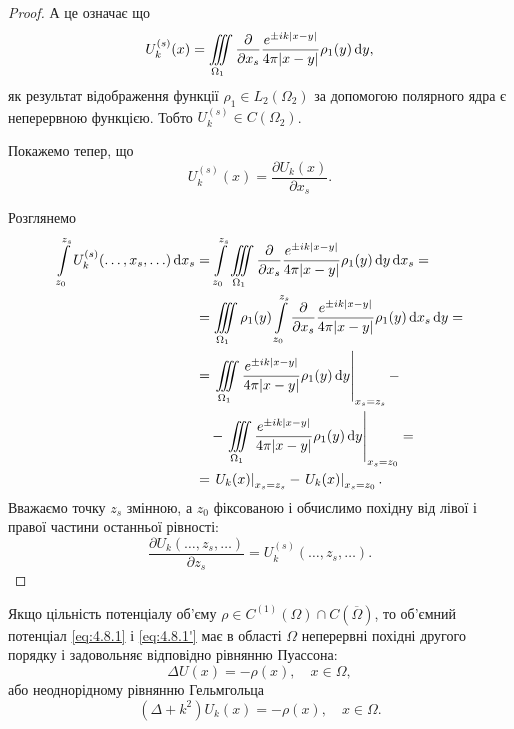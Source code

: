 \begin{proof}
	А це означає що
	\begin{equation}
		U_k^{(s)}(x) = \displaystyle\iiint\limits_{\Omega_1} \frac{\partial}{\partial x_s} \frac{e^{\pm i k |x - y|}}{4 \pi |x - y|} \rho_1(y) \mathop{}\!\mathrm{d} y,
	\end{equation}
	як результат відображення функції $\rho_1 \in L_2(\Omega_2)$ за допомогою полярного ядра є неперервною функцією. Тобто $U_k^{(s)} \in C(\Omega_2)$. \medskip

	Покажемо тепер, що
	\begin{equation}
		U_k^{(s)}(x) = \frac{\partial U_k(x)}{\partial x_s}.
	\end{equation}

	Розглянемо
	\begin{equation}
		\begin{aligned}
			\displaystyle\int\limits_{z_0}^{z_s} U_k^{(s)}(\ldots, x_s, \ldots) \mathop{}\!\mathrm{d} x_s &= \displaystyle\int\limits_{z_0}^{z_s} \displaystyle\iiint\limits_{\Omega_1} \frac{\partial}{\partial x_s} \frac{e^{\pm i k |x - y|}}{4 \pi |x - y|} \rho_1(y) \mathop{}\!\mathrm{d} y \mathop{}\!\mathrm{d} x_s = \\
			&= \displaystyle\iiint\limits_{\Omega_1} \rho_1(y) \displaystyle\int\limits_{z_0}^{z_s} \frac{\partial}{\partial x_s} \frac{e^{\pm i k |x - y|}}{4 \pi |x - y|} \rho_1(y) \mathop{}\!\mathrm{d} x_s \mathop{}\!\mathrm{d} y = \\
			&= \left. \displaystyle\iiint\limits_{\Omega_1} \frac{e^{\pm i k |x - y|}}{4 \pi |x - y|} \rho_1(y) \mathop{}\!\mathrm{d} y \right|_{x_s = z_s} - \\
			& \quad - \left. \displaystyle\iiint\limits_{\Omega_1} \frac{e^{\pm i k |x - y|}}{4 \pi |x - y|} \rho_1(y) \mathop{}\!\mathrm{d} y \right|_{x_s = z_0} = \\
			&= \left. U_k(x) \right|_{x_s = z_s} - \left. U_k(x) \right|_{x_s = z_0}.
		\end{aligned}
	\end{equation}
	Вважаємо точку $z_s$ змінною, а $z_0$ фіксованою і обчислимо похідну від лівої і правої частини останньої рівності:
	\begin{equation}
		\frac{\partial U_k(\ldots, z_s, \ldots)}{\partial z_s} = U_k^{(s)} (\ldots, z_s, \ldots).
	\end{equation}
\end{proof}

\begin{theorem}
	\label{th:4.8.3}
	Якщо цільність потенціалу об'єму $\rho \in C^{(1)}(\Omega) \cap C(\overline{\Omega})$, то об'ємний потенціал \eqref{eq:4.8.1} і \eqref{eq:4.8.1'} має в області $\Omega$ неперервні похідні другого порядку і задовольняє відповідно рівнянню Пуассона:
	\begin{equation}
		\label{eq:4.8.8}
		\Delta U(x) = - \rho(x), \quad x \in \Omega,
	\end{equation}
	або неоднорідному рівнянню Гельмгольца 
	\begin{equation}
		\label{eq:4.8.8'}
		(\Delta + k^2) U_k(x) = - \rho(x), \quad x \in \Omega.
	\end{equation}
\end{theorem}

